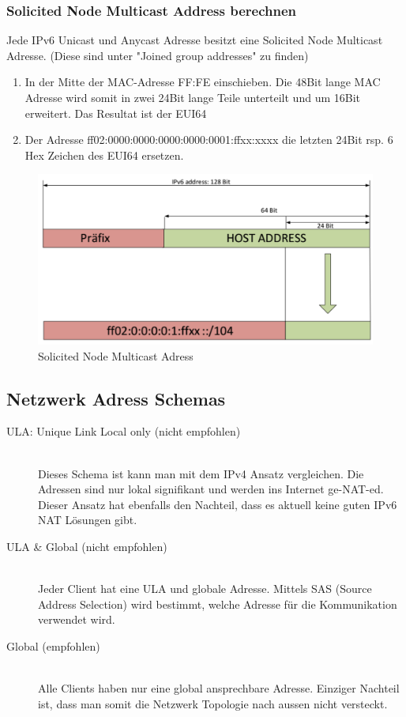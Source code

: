 \subsubsection{Solicited Node Multicast Address berechnen}
Jede IPv6 Unicast und Anycast Adresse besitzt eine Solicited Node Multicast Adresse. (Diese sind unter "Joined group addresses" zu finden)
\begin{enumerate}
	\item In der Mitte der MAC-Adresse FF:FE einschieben. Die 48Bit lange MAC Adresse wird somit in zwei 24Bit lange Teile unterteilt und um 16Bit erweitert. Das Resultat ist der EUI64
	\item Der Adresse ff02:0000:0000:0000:0000:0001:ffxx:xxxx die letzten 24Bit rsp. 6 Hex Zeichen des EUI64 ersetzen.
\end{enumerate}
\begin{figure}[h!]
	\centering
	\includegraphics[width=0.4\linewidth]{images/solicited_node_multicast.pdf}
	\caption{Solicited Node Multicast Adress}
\end{figure}

\subsection{Netzwerk Adress Schemas}
\begin{description}
	\item[ULA: Unique Link Local only (nicht empfohlen)] \hfill \\
	Dieses Schema ist kann man mit dem IPv4 Ansatz vergleichen. Die Adressen sind nur lokal signifikant und werden ins Internet ge-NAT-ed. Dieser Ansatz hat ebenfalls den Nachteil, dass es aktuell keine guten IPv6 NAT Lösungen gibt.
	\item[ULA \& Global (nicht empfohlen)] \hfill \\
	Jeder Client hat eine ULA und globale Adresse. Mittels SAS (Source Address Selection) wird bestimmt, welche Adresse für die Kommunikation verwendet wird. 
	\item[Global (empfohlen)] \hfill \\
	Alle Clients haben nur eine global ansprechbare Adresse. Einziger Nachteil ist, dass man somit die Netzwerk Topologie nach aussen nicht versteckt.
\end{description}

